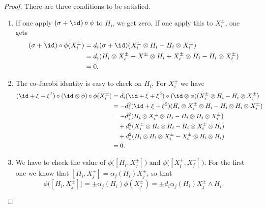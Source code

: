 \begin{proof}
    There are three conditions to be satisfied.
    \begin{enumerate}
        \item
            If one apply \( (\sigma+\id)\circ\phi\) to \( H_i\), we get zero. If one apply this to \( X^{\pm}_i\), one gets
            \begin{equation}
                \begin{aligned}[]
                    (\sigma+\id)\circ\phi(X^{\pm}_i)&=d_i(\sigma+\id)(X_i^{\pm}\otimes H_i-H_i\otimes X^{\pm}_i)\\
                    &=d_i( H_i\otimes X_i^{\pm}-X^{\pm}\otimes H_i + X_i^{\pm}\otimes H_i-H_i\otimes X^{\pm}_i  )\\
                    &=0.
                \end{aligned}
            \end{equation}
        \item
            The co-Jacobi identity is easy to check on \( H_i\). For \( X^{\pm}_i\) we have
            \begin{equation}
                \begin{aligned}[]
                    (\id+\xi+\xi^2)\circ(\id\otimes\phi)\circ\phi(X^{\pm}_i)&=d_i(\id+\xi+\xi^2)\circ(\id\otimes\phi)(X^{\pm}_i\otimes H_i-H_i\otimes X_i^{\pm})\\
                    &=-d_i^2(\id+\xi+\xi^2)(H_i\otimes X^{\pm}_i\otimes H_i-H_i\otimes H_i\otimes X^{\pm}_i)\\
                    &=-d_i^2(H_i\otimes X^{\pm}_i\otimes H_i-H_i\otimes H_i\otimes X^{\pm}_i)\\
                    &\quad+d_i^2(X^{\pm}_i\otimes H_i\otimes H_i-H_i\otimes X^{\pm}_i\otimes H_i)\\
                    &\quad +d_i^2(H_i\otimes H_i\otimes X^{\pm}_i-X^{\pm}_i\otimes H_i\otimes H_i)\\
                    &=0.
                \end{aligned}
            \end{equation}
        \item
            We have to check the value of \( \phi\big( [H_i,X_{j}^{\pm}] \big)\) and \( \phi\big( [X_i^+,X_j^-] \big)\). For the first one we know that \( [H_i,X_j^{\pm}]=\alpha_j(H_i)X_j^{\pm}\), so that
            \begin{equation}        \label{EqphiHXcobrack}
                \phi\big( [H_i,X_j^{\pm}] \big)=\pm\alpha_j(H_i)\phi(X_j^{\pm})=\pm d_i\alpha_j(H_i) X_j^{\pm}\wedge H_i.

\end{equation}
\end{enumerate}
\end{proof}
